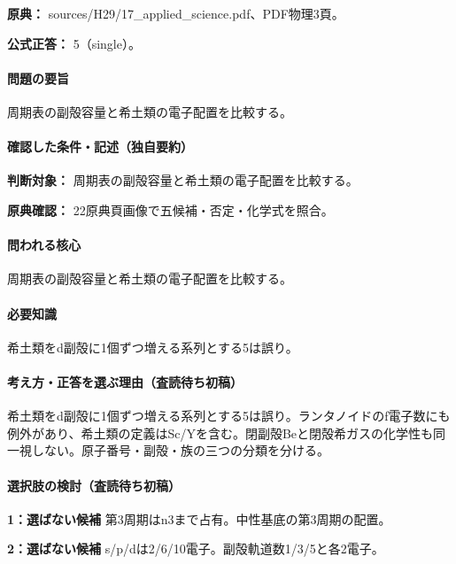 \noindent\textbf{原典：} sources/H29/17\_applied\_science.pdf、PDF物理3頁。

\textbf{公式正答：} 5（single）。

\paragraph{問題の要旨} 周期表の副殻容量と希土類の電子配置を比較する。

\paragraph{確認した条件・記述（独自要約）}\mbox{}\par

\noindent\textbf{判断対象：} 周期表の副殻容量と希土類の電子配置を比較する。\par

\noindent\textbf{原典確認：} 22原典頁画像で五候補・否定・化学式を照合。\par

\paragraph{問われる核心} 周期表の副殻容量と希土類の電子配置を比較する。

\paragraph{必要知識} 希土類をd副殻に1個ずつ増える系列とする5は誤り。

\paragraph{考え方・正答を選ぶ理由（査読待ち初稿）} 希土類をd副殻に1個ずつ増える系列とする5は誤り。ランタノイドのf電子数にも例外があり、希土類の定義はSc/Yを含む。閉副殻Beと閉殻希ガスの化学性も同一視しない。原子番号・副殻・族の三つの分類を分ける。

\paragraph{選択肢の検討（査読待ち初稿）}\mbox{}\par

\noindent\textbf{1：選ばない候補} 第3周期はn3まで占有。中性基底の第3周期の配置。\par

\noindent\textbf{2：選ばない候補} s/p/dは2/6/10電子。副殻軌道数1/3/5と各2電子。\par


